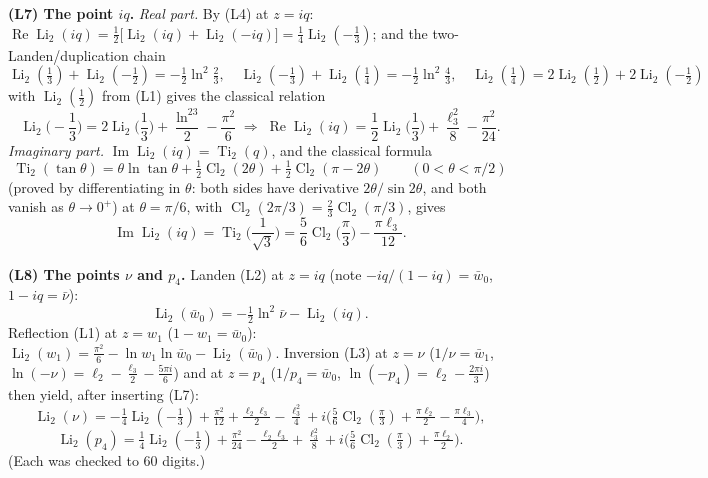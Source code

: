 \documentclass[11pt]{article}
\theoremstyle{remark}
\begin{document}
\textbf{(L7) The point $iq$.}
\textit{Real part.} By (L4) at $z=iq$: $\operatorname{Re}\operatorname{Li}_2(iq)=\tfrac12\big[\operatorname{Li}_2(iq)+\operatorname{Li}_2(-iq)\big]=\tfrac14\operatorname{Li}_2(-\tfrac13)$; and the two-Landen/duplication chain
\[
\operatorname{Li}_2(\tfrac13)+\operatorname{Li}_2(-\tfrac12)=-\tfrac12\ln^2\tfrac23,\quad
\operatorname{Li}_2(-\tfrac13)+\operatorname{Li}_2(\tfrac14)=-\tfrac12\ln^2\tfrac43,\quad
\operatorname{Li}_2(\tfrac14)=2\operatorname{Li}_2(\tfrac12)+2\operatorname{Li}_2(-\tfrac12)
\]
with $\operatorname{Li}_2(\tfrac12)$ from (L1) gives the classical relation
\[
\operatorname{Li}_2\!\Big(-\frac13\Big)=2\operatorname{Li}_2\!\Big(\frac13\Big)+\frac{\ln^23}{2}-\frac{\pi^2}{6}
\;\Longrightarrow\;
\operatorname{Re}\operatorname{Li}_2(iq)=\frac12\operatorname{Li}_2\!\Big(\frac13\Big)+\frac{\ell_3^2}{8}-\frac{\pi^2}{24}.
\]
\textit{Imaginary part.} $\operatorname{Im}\operatorname{Li}_2(iq)=\operatorname{Ti}_2(q)$, and the classical formula
\[
\operatorname{Ti}_2(\tan\theta)=\theta\ln\tan\theta+\tfrac12\operatorname{Cl}_2(2\theta)+\tfrac12\operatorname{Cl}_2(\pi-2\theta)
\qquad(0<\theta<\pi/2)
\]
(proved by differentiating in $\theta$: both sides have derivative $2\theta/\sin2\theta$, and both vanish as $\theta\to0^+$) at $\theta=\pi/6$, with $\operatorname{Cl}_2(2\pi/3)=\tfrac23\operatorname{Cl}_2(\pi/3)$, gives
\[
\operatorname{Im}\operatorname{Li}_2(iq)=\operatorname{Ti}_2\!\Big(\frac1{\sqrt3}\Big)=\frac56\operatorname{Cl}_2\!\Big(\frac\pi3\Big)-\frac{\pi\ell_3}{12}.
\]

\textbf{(L8) The points $\nu$ and $p_4$.} Landen (L2) at $z=iq$ (note $-iq/(1-iq)=\bar w_0$, $1-iq=\bar\nu$):
\[
\operatorname{Li}_2(\bar w_0)=-\tfrac12\ln^2\bar\nu-\operatorname{Li}_2(iq).
\]
Reflection (L1) at $z=w_1$ ($1-w_1=\bar w_0$):
$\operatorname{Li}_2(w_1)=\tfrac{\pi^2}6-\ln w_1\ln\bar w_0-\operatorname{Li}_2(\bar w_0)$.
Inversion (L3) at $z=\nu$ ($1/\nu=\bar w_1$, $\ln(-\nu)=\ell_2-\tfrac{\ell_3}{2}-\tfrac{5\pi i}{6}$) and at $z=p_4$ ($1/p_4=\bar w_0$, $\ln(-p_4)=\ell_2-\tfrac{2\pi i}{3}$) then yield, after inserting (L7):
\[
\operatorname{Li}_2(\nu)=-\tfrac14\operatorname{Li}_2(-\tfrac13)+\tfrac{\pi^2}{12}+\tfrac{\ell_2\ell_3}{2}-\tfrac{\ell_3^2}{4}
+i\Big(\tfrac56\operatorname{Cl}_2(\tfrac\pi3)+\tfrac{\pi\ell_2}{2}-\tfrac{\pi\ell_3}{4}\Big),
\]
\[
\operatorname{Li}_2(p_4)=\tfrac14\operatorname{Li}_2(-\tfrac13)+\tfrac{\pi^2}{24}-\tfrac{\ell_2\ell_3}{2}+\tfrac{\ell_3^2}{8}
+i\Big(\tfrac56\operatorname{Cl}_2(\tfrac\pi3)+\tfrac{\pi\ell_2}{2}\Big).
\]
(Each was checked to $60$ digits.)
\end{document}
